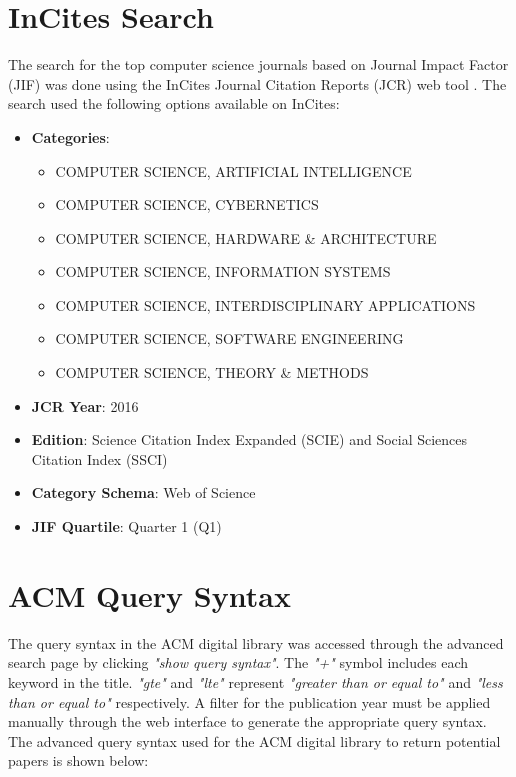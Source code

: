 



\appendices

\section{InCites Search}
\label{appendix:incites_search}
The search for the top computer science journals based on Journal Impact Factor (JIF) \cite{Garfield:2006b} was done using the InCites Journal Citation Reports (JCR) web tool \cite{Clarivate:2017a}. The search used the following options available on InCites:

\begin{itemize}
  \item \textbf{Categories}:
	\begin{itemize}
		\item COMPUTER SCIENCE, ARTIFICIAL INTELLIGENCE
		\item COMPUTER SCIENCE, CYBERNETICS
		\item COMPUTER SCIENCE, HARDWARE \& ARCHITECTURE
		\item COMPUTER SCIENCE, INFORMATION SYSTEMS
		\item COMPUTER SCIENCE, INTERDISCIPLINARY APPLICATIONS
		\item COMPUTER SCIENCE, SOFTWARE ENGINEERING
		\item COMPUTER SCIENCE, THEORY \& METHODS
	\end{itemize}
  \item \textbf{JCR Year}: 2016
  \item \textbf{Edition}: Science Citation Index Expanded (SCIE) \cite{Garfield:2006a} and Social Sciences Citation Index (SSCI) \cite{Klein:2004}
  \item \textbf{Category Schema}: Web of Science \cite{Clarivate:2017b}
  \item \textbf{JIF Quartile}: Quarter 1 (Q1)
\end{itemize}

\section{ACM Query Syntax}
\label{appendix:acm_querysyntax}
The query syntax in the ACM digital library was accessed through the advanced search page by clicking \textit{"show query syntax"}. The \textit{"+"} symbol includes each keyword in the title. \textit{"gte"} and \textit{"lte"} represent \textit{"greater than or equal to"} and \textit{"less than or equal to"} respectively. A filter for the publication year must be applied manually through the web interface to generate the appropriate query syntax. The advanced query syntax used for the ACM digital library to return potential papers is shown below:

